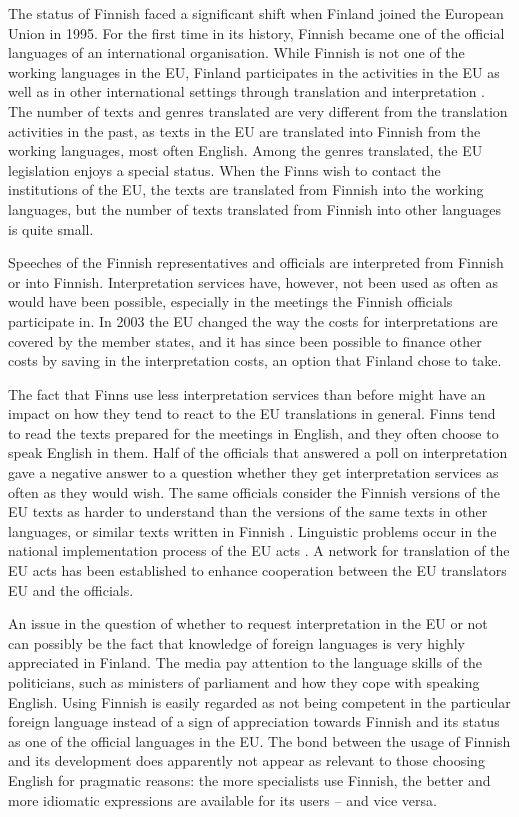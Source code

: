 \begin{multicols}{2}
The status of Finnish faced a significant shift when Finland joined the European Union in 1995. For the first time in its history, Finnish became one of the official languages of an international organisation. While Finnish is not one of the working languages in the EU, Finland participates in the activities in the EU as well as in other international settings through translation and interpretation \cite{Tulevaisuus2009}. The number of texts and genres translated are very different from the translation activities in the past, as texts in the EU are translated into Finnish from the working languages, most often English.  Among the genres translated, the EU legislation enjoys a special status. When the Finns wish to contact the institutions of the EU, the texts are translated from Finnish into the working languages, but the number of texts translated from Finnish into other languages is quite small.

Speeches of the Finnish representatives and officials are interpreted from Finnish or into Finnish. Interpretation services have, however, not been used as often as would have been possible, especially in the meetings the Finnish officials participate in. In 2003 the EU changed the way the costs for interpretations are covered by the member states, and it has since been possible to finance other costs by saving in the interpretation costs, an option that Finland chose to take.
\columnbreak

The fact that Finns use less interpretation services than before might have an impact on how they tend to react to the EU translations in general. Finns tend to read the texts prepared for the meetings in English, and they often choose to speak English in them. Half of the officials that answered a poll on interpretation gave a negative answer to a question whether they get interpretation services as often as they would wish. The same officials consider the Finnish versions of the EU texts as harder to understand than the versions of the same texts in other languages, or similar texts written in Finnish \cite{Piehl2008}. Linguistic problems occur in the national implementation process of the EU acts \cite{OECD2010}. A network for translation of the EU acts has been established to enhance cooperation between the EU translators EU and the officials.

An issue in the question of whether to request interpretation in the EU or not can possibly be the fact that knowledge of foreign languages is very highly appreciated in Finland. The media pay attention to the language skills of the politicians, such as ministers of parliament and how they cope with speaking English. Using Finnish is easily regarded as not being competent in the particular foreign language instead of a sign of appreciation towards Finnish and its status as one of the official languages in the EU. The bond between the usage of Finnish and its development does apparently not appear as relevant to those choosing English for pragmatic reasons: the more specialists use Finnish, the better and more idiomatic expressions are available for its users -- and vice versa.


\end{multicols}
